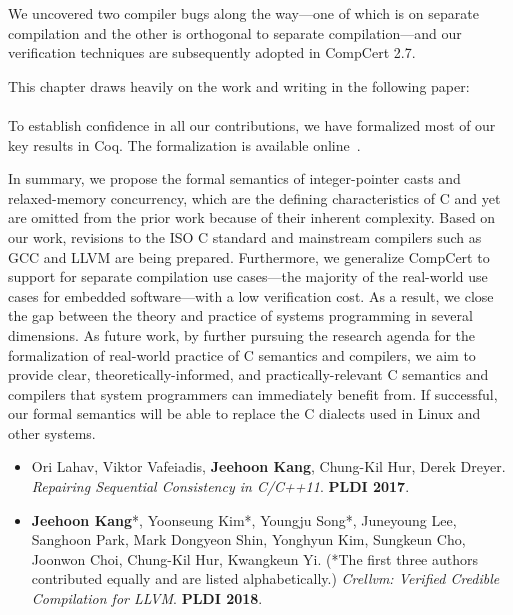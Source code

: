 We uncovered two compiler bugs along the way---one of which is on separate compilation and the other
is orthogonal to separate compilation---and our verification techniques are subsequently adopted in
CompCert 2.7.

This chapter draws heavily on the work and writing in the following paper:


\paragraph*{}

To establish confidence in all our contributions, we have formalized most of our key results in Coq.
The formalization is available online~\cite{kang-phd-thesis-web}.

In summary, we propose the formal semantics of integer-pointer casts and relaxed-memory concurrency,
which are the defining characteristics of C and yet are omitted from the prior work because of their
inherent complexity.  Based on our work, revisions to the ISO C standard and mainstream compilers
such as GCC and LLVM are being prepared.  Furthermore, we generalize CompCert to support for
separate compilation use cases---the majority of the real-world use cases for embedded
software---with a low verification cost.  As a result, we close the gap between the theory and
practice of systems programming in several dimensions.  As future work, by further pursuing the
research agenda for the formalization of real-world practice of C semantics and compilers, we aim to
provide clear, theoretically-informed, and practically-relevant C semantics and compilers that
system programmers can immediately benefit from.  If successful, our formal semantics will be able
to replace the C dialects used in Linux and other systems.




\begin{itemize}
\item[\cite{scfix}] Ori Lahav, Viktor Vafeiadis, \textbf{Jeehoon Kang}, Chung-Kil Hur, Derek Dreyer.
  \emph{Repairing Sequential Consistency in C/C++11}.  \textbf{PLDI 2017}.
\item[\cite{crellvm}] \textbf{Jeehoon Kang}*, Yoonseung Kim*, Youngju Song*, Juneyoung Lee, Sanghoon
  Park, Mark Dongyeon Shin, Yonghyun Kim, Sungkeun Cho, Joonwon Choi, Chung-Kil Hur, Kwangkeun Yi.
  (*The first three authors contributed equally and are listed alphabetically.)  \emph{Crellvm:
    Verified Credible Compilation for LLVM}.  \textbf{PLDI 2018}.
\end{itemize}


